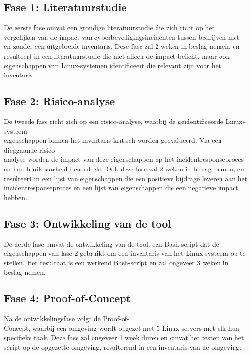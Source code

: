 \subsection{Fase 1: Literatuurstudie}%
\label{sub:literatuurstudie}

De eerste fase omvat een grondige literatuurstudie die zich richt op het vergelijken van de impact van cyberbeveiligingsincidenten tussen bedrijven met en zonder een uitgebreide inventaris.
Deze fase zal 2 weken in beslag nemen, en resulteert in een literatuurstudie die niet alleen de impact belicht, maar ook eigenschappen van Linux-systemen identificeert die relevant zijn voor het inventaris.

\subsection{Fase 2: Risico-analyse}%
\label{sub:risico_analyse}

De tweede fase richt zich op een risico-analyse, waarbij de ge\"identificeerde Linux-systeem\\eigenschappen binnen het inventaris kritisch worden ge\"evalueerd.
Via een diepgaande risico-\\analyse worden de impact van deze eigenschappen op het incidentresponseproces en hun bruikbaarheid beoordeeld.
Ook deze fase zal 2 weken in beslag nemen, en resulteert in een lijst van eigenschappen die een positieve bijdrage leveren aan het incidentresponseproces en een lijst van eigenschappen die een negatieve impact hebben.

\subsection{Fase 3: Ontwikkeling van de tool}%
\label{sub:ontwikkeling_van_de_tool}

De derde fase omvat de ontwikkeling van de tool, een Bash-script dat de eigenschappen van fase 2 gebruikt om een inventaris van het Linux-systeem op te stellen.
Het resultaat is een werkend Bash-script en zal ongeveer 3 weken in beslag nemen.

\subsection{Fase 4: Proof-of-Concept}%
\label{sub:proof_of_concept}

Na de ontwikkelingsfase volgt de Proof-of-\\Concept, waarbij een omgeving wordt opgezet met 5 Linux-servers met elk hun specifieke taak.
Deze fase zal ongeveer 1 week duren en omvat het testen van het script op de opgezette omgeving, resulterend in een inventaris van de omgeving.

